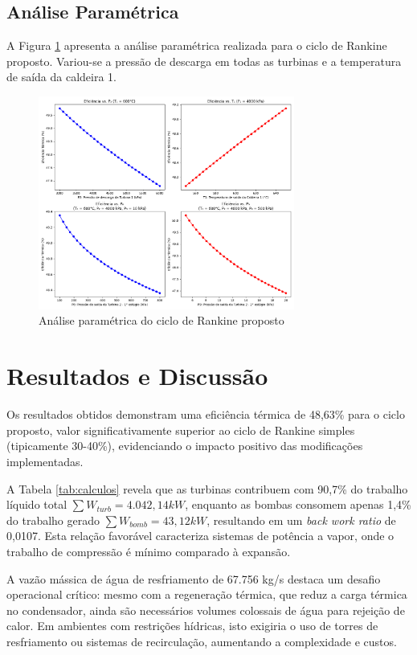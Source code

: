 \documentclass[
	article,			%
	11pt,				%
	oneside,			%
	a4paper,			%
	english,			%
	brazil,				%
	sumario=tradicional
	]{abntex2}
\begin{document}
\subsection{Análise Paramétrica}

A Figura \ref{fig:analise_parametrica} apresenta a análise paramétrica realizada para o ciclo de Rankine proposto. Variou-se a pressão de descarga em todas as turbinas e a temperatura de saída da caldeira 1.

\begin{figure}[H]
	\centering
	\includegraphics[width=0.75\textwidth]{./images/analise_parametrica.png}
	\caption{Análise paramétrica do ciclo de Rankine proposto}
	\label{fig:analise_parametrica}
\end{figure}

\section{Resultados e Discussão}

Os resultados obtidos demonstram uma eficiência térmica de 48,63\% para o ciclo proposto, valor significativamente superior ao ciclo de Rankine simples (tipicamente 30-40\%), evidenciando o impacto positivo das modificações implementadas.

A Tabela \ref{tab:calculos} revela que as turbinas contribuem com 90,7\% do trabalho líquido total $\sum{W_{turb}} = 4.042,14 kW$, enquanto as bombas consomem apenas 1,4\% do trabalho gerado $\sum{W_{bomb}} = 43,12 kW$, resultando em um \textit{back work ratio} de 0,0107. Esta relação favorável caracteriza sistemas de potência a vapor, onde o trabalho de compressão é mínimo comparado à expansão.

A vazão mássica de água de resfriamento de 67.756 kg/s destaca um desafio operacional crítico: mesmo com a regeneração térmica, que reduz a carga térmica no condensador, ainda são necessários volumes colossais de água para rejeição de calor. Em ambientes com restrições hídricas, isto exigiria o uso de torres de resfriamento ou sistemas de recirculação, aumentando a complexidade e custos.
\end{document}

